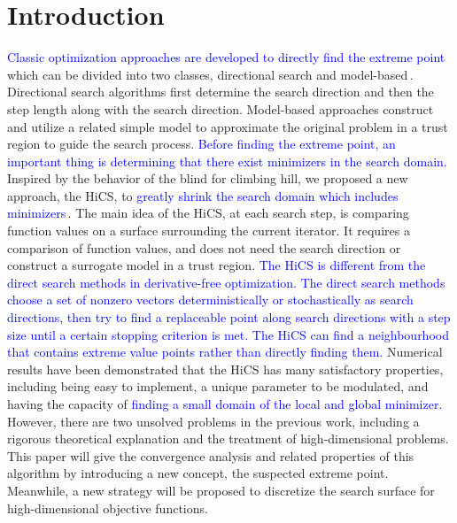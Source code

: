 \documentclass[mathpazo]{csam}
\theoremstyle{remark}
\begin{document}
	\maketitle
	
\section{Introduction}
\label{sec:intro}

\textcolor{blue}{
Classic optimization approaches are developed to directly find the extreme point}
which can be divided into two
classes, directional search and model-based\,\cite{sun2006optimization,
nocedal2006numerical, conn2009introduction}.  Directional search algorithms first
determine the search direction and then the step length along with the search
direction. Model-based approaches construct and utilize a related simple model to
approximate the original problem in a trust region to guide the search process. 
\textcolor{blue}{
Before finding the extreme point, an important thing is 
determining that there exist minimizers in the search domain.
}
Inspired by the behavior of the blind for climbing hill, we
proposed a new approach, the HiCS, to \textcolor{blue}{greatly shrink the search
domain which includes minimizers}\,\cite{huang2017hill}.
The main idea of the HiCS, at each search step, is comparing
function values on a surface surrounding the current iterator.
It requires a comparison of function values, and does not need the search direction
or construct a surrogate model in a trust region.
\textcolor{blue}{
The HiCS is different from the direct search methods in
derivative-free optimization. The direct search methods choose a set of nonzero
vectors deterministically or stochastically as search directions, then try to find a
replaceable point along search directions with a step size until a certain stopping
criterion is met.  
The HiCS can find a neighbourhood that contains extreme value points
rather than directly finding them. 
}
Numerical results have been demonstrated that the HiCS has many 
satisfactory properties, including being easy to implement,
a unique parameter to be modulated, and having the capacity
of \textcolor{blue}{finding a small domain of the local and global minimizer. }
However, there are two unsolved problems in the
previous work, including a rigorous theoretical explanation and
the treatment of high-dimensional problems.
This paper will give the convergence analysis and related
properties of this algorithm by introducing a new concept, the suspected extreme
point.
Meanwhile, a new strategy will be proposed to discretize the search
surface for high-dimensional objective functions.
\end{document}
